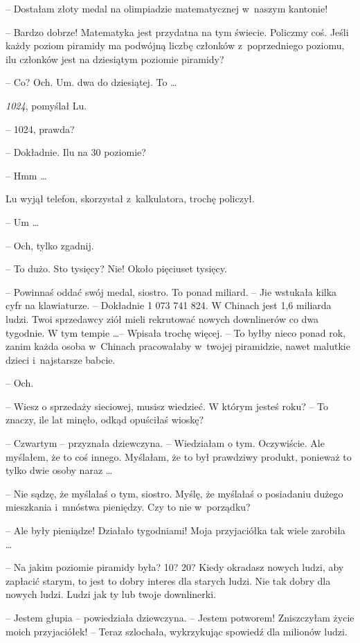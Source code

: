 \documentclass[oneside,polish,11pt,rmheadings]{mwbk}
\begin{document}
-- Dostałam złoty medal na olimpiadzie matematycznej w~naszym kantonie! 

-- Bardzo dobrze! Matematyka jest przydatna na tym świecie. Policzmy coś. Jeśli każdy poziom piramidy ma podwójną liczbę członków z~poprzedniego poziomu, ilu członków jest na dziesiątym poziomie piramidy?

-- Co? Och. Um. dwa do dziesiątej. To  \ldots  

\textit{1024}, pomyślał Lu. 

-- 1024, prawda? 

-- Dokładnie. Ilu na 30 poziomie? 

-- Hmm \ldots 

Lu wyjął telefon, skorzystał z~kalkulatora, trochę policzył.

-- Um \ldots  

-- Och, tylko zgadnij.

-- To dużo. Sto tysięcy? Nie! Około pięciuset tysięcy.

-- Powinnaś oddać swój medal, siostro. To ponad miliard. -- Jie wstukała kilka cyfr na klawiaturze. -- Dokładnie 1 073 741 824. W Chinach jest 1,6 miliarda ludzi. Twoi sprzedawcy ziół mieli rekrutować nowych downlinerów co dwa tygodnie. W tym tempie \ldots  -- Wpisała trochę więcej. -- To byłby nieco ponad rok, zanim każda osoba w~Chinach pracowałaby w~twojej piramidzie, nawet malutkie dzieci i~najstarsze babcie.

-- Och.

-- Wiesz o sprzedaży sieciowej, musisz wiedzieć. W którym jesteś roku? -- To znaczy, ile lat minęło, odkąd opuściłaś wioskę?

-- Czwartym -- przyznała dziewczyna. -- Wiedziałam o tym. Oczywiście. Ale myślałem, że to coś innego. Myślałam, że to był prawdziwy produkt, ponieważ to tylko dwie osoby naraz \ldots 

-- Nie sądzę, że myślałaś o tym, siostro. Myślę, że myślałaś o posiadaniu dużego mieszkania i~mnóstwa pieniędzy. Czy to nie w~porządku?

-- Ale były pieniądze! Działało tygodniami! Moja przyjaciółka tak wiele zarobiła \ldots 

-- Na jakim poziomie piramidy była? 10? 20? Kiedy okradasz nowych ludzi, aby zapłacić starym, to jest to dobry interes dla starych ludzi. Nie tak dobry dla nowych ludzi. Ludzi jak ty lub twoje downlinerki.

-- Jestem głupia -- powiedziała dziewczyna. -- Jestem potworem! Zniszczyłam życie moich przyjaciółek! -- Teraz szlochała, wykrzykując spowiedź dla milionów ludzi.
\end{document}

